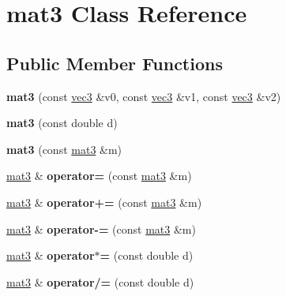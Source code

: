 \hypertarget{classmat3}{
\section{mat3 Class Reference}
\label{classmat3}
}
\subsection*{Public Member Functions}
\begin{DoxyCompactItemize}
\item 
\hypertarget{classmat3_a5e327d985b68ef2a0cc46fb417aefeaf}{
{\bfseries mat3} (const \hyperlink{classvec3}{vec3} \&v0, const \hyperlink{classvec3}{vec3} \&v1, const \hyperlink{classvec3}{vec3} \&v2)}
\label{classmat3_a5e327d985b68ef2a0cc46fb417aefeaf}

\item 
\hypertarget{classmat3_ae9d73a3e9a7b4053cf0c340c314448f0}{
{\bfseries mat3} (const double d)}
\label{classmat3_ae9d73a3e9a7b4053cf0c340c314448f0}

\item 
\hypertarget{classmat3_a0427bedc9ba6cb374d89618293dda305}{
{\bfseries mat3} (const \hyperlink{classmat3}{mat3} \&m)}
\label{classmat3_a0427bedc9ba6cb374d89618293dda305}

\item 
\hypertarget{classmat3_a5e2191dc318a5bfbdb45ba695da90a7f}{
\hyperlink{classmat3}{mat3} \& {\bfseries operator=} (const \hyperlink{classmat3}{mat3} \&m)}
\label{classmat3_a5e2191dc318a5bfbdb45ba695da90a7f}

\item 
\hypertarget{classmat3_a5afea6651ce57716e6e80f90c1001bbd}{
\hyperlink{classmat3}{mat3} \& {\bfseries operator+=} (const \hyperlink{classmat3}{mat3} \&m)}
\label{classmat3_a5afea6651ce57716e6e80f90c1001bbd}

\item 
\hypertarget{classmat3_af99c2cc186192a7a89ece245ed071762}{
\hyperlink{classmat3}{mat3} \& {\bfseries operator-\/=} (const \hyperlink{classmat3}{mat3} \&m)}
\label{classmat3_af99c2cc186192a7a89ece245ed071762}

\item 
\hypertarget{classmat3_a3ab2cdf70f8108f8e828cf10fa385025}{
\hyperlink{classmat3}{mat3} \& {\bfseries operator$\ast$=} (const double d)}
\label{classmat3_a3ab2cdf70f8108f8e828cf10fa385025}

\item 
\hypertarget{classmat3_a33dfe965118c290dad9a8b71585ba5fb}{
\hyperlink{classmat3}{mat3} \& {\bfseries operator/=} (const double d)}
\label{classmat3_a33dfe965118c290dad9a8b71585ba5fb}


\end{DoxyCompactItemize}
